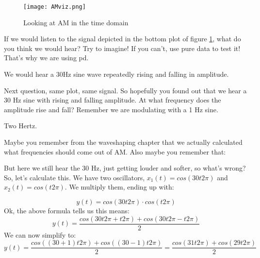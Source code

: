 \begin{figure}[h!]
	\centering
	\texttt{[image: AMviz.png]}
	\caption[AM time domain]
	{Looking at AM in the time domain}
	\label{fig:AMViz}
\end{figure}

\begin{question}
	If we would listen to the signal depicted in the bottom plot of figure \ref{fig:AMViz}, what do you think we would hear? Try to imagine! If you can't, use pure data to test it! That's why we are using pd.
\end{question}
\begin{Answer}
	We would hear a 30Hz sine wave repeatedly rising and falling in amplitude.
\end{Answer}

\begin{question}
	Next question, same plot, same signal. So hopefully you found out that we hear a 30 Hz sine with rising and falling amplitude. At what frequency does the amplitude rise and fall? Remember we are modulating with a 1 Hz sine.
\end{question}
\begin{Answer}
	Two Hertz. 
\end{Answer}

Maybe you remember from the waveshaping chapter that we actually calculated what frequencies should come out of AM. Also maybe you remember that:

But here we still hear the 30 Hz, just getting louder and softer, so what's wrong?\\
So, let's calculate this. We have two oscillators, $x_1(t) = cos(30t2\pi)$ and $x_2(t)=cos(t2\pi)$. We multiply them, ending up with:

\begin{equation}
	y(t) = cos(30t2\pi) \cdot cos(t2\pi)
\end{equation}
Ok, the above formula tells us this means:
\begin{equation}
	y(t) = \frac{cos(30t2\pi+t2\pi)+cos(30t2\pi-t2\pi)}{2}
\end{equation}
We can now simplify to:
\begin{equation}
	y(t) = \frac{cos((30+1)t2\pi)+cos((30-1)t2\pi)}{2} = \frac{cos(31t2\pi)+cos(29t2\pi)}{2}
\end{equation}

